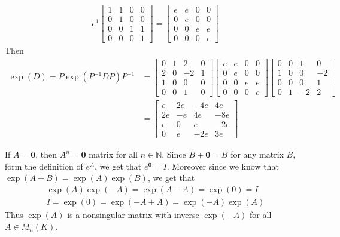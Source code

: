 \documentclass[12pt]{exam}
\theoremstyle{plain} %
\theoremstyle{definition} %
\theoremstyle{remark} %
\begin{document}
\begin{questions}
\begin{solution}
\begin{align*}
      e^{1}
      \begin{bmatrix}%
        1 & 1 & 0 & 0\\
        0 & 1 & 0 & 0\\
        0 & 0 & 1 & 1\\
        0 & 0 & 0 & 1
      \end{bmatrix} =
      \begin{bmatrix}%
        e & e & 0 & 0\\
        0 & e & 0 & 0\\
        0 & 0 & e & e\\
        0 & 0 & 0 & e
      \end{bmatrix}
    \end{align*}
    Then
    \begin{align*}
      \exp(D) = P\exp(P^{-1}DP)P^{-1} &=
      \begin{bmatrix}%
        0 & 1 & 2 & 0\\
        2 & 0 & -2 & 1\\
        1 & 0 & 0 & 0\\
        0 & 0 & 1 & 0
      \end{bmatrix}
      \begin{bmatrix}%
        e & e & 0 & 0\\
        0 & e & 0 & 0\\
        0 & 0 & e & e\\
        0 & 0 & 0 & e
      \end{bmatrix}
      \begin{bmatrix}%
        0 & 0 & 1 & 0\\
        1 & 0 & 0 & -2\\
        0 & 0 & 0 & 1\\
        0 & 1 & -2 & 2
      \end{bmatrix} \\
      &=
      \begin{bmatrix}%
        e & 2e & -4e & 4e\\
        2e & -e & 4e & -8e\\
        e & 0 & e & -2e\\
        0 & e & -2e & 3e
      \end{bmatrix}
    \end{align*}
  \end{solution}

  \question
  \begin{solution}
    If $A = \textbf{0}$, then $A^n = \textbf{0}$ matrix for all $n
    \in \mathbb{N}$. Since $B + \textbf{0} = B$ for any matrix $B$,
    form the definition of $e^A$, we get that
    $e^{\textbf{0}} = I$. Moreover since we know that $\exp(A + B) =
    \exp(A)\exp(B)$, we get that
    \begin{align*}
      \exp(A)\exp(-A) = \exp(A - A) = \exp(0) = I\\
      I= \exp(0) = \exp(-A
      + A) = \exp(-A)\exp(A)
    \end{align*}
    Thus $\exp(A)$ is a nonsingular matrix with inverse $\exp(-A)$
    for all $A \in M_n(K)$.
  \end{solution}


\end{questions}
\end{document}
